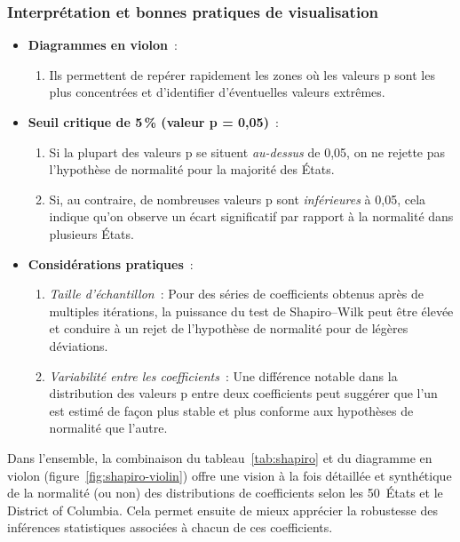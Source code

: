 \subsubsection*{Interprétation et bonnes pratiques de visualisation}
\begin{itemize}
	\item \textbf{Diagrammes en violon}~: 
	\begin{enumerate}une boîte à moustaches central (indiquant la médiane et les quartiles) avec une courbe de densité symétrique autour de l'axe vertical. 
		\item Ils permettent de repérer rapidement les zones où les valeurs p sont les plus concentrées et d'identifier d'éventuelles valeurs extrêmes.
	\end{enumerate}
	
	\item \textbf{Seuil critique de 5\,\% (valeur p = 0,05)}~:  
	\begin{enumerate}
		\item Si la plupart des valeurs p se situent \emph{au-dessus} de 0,05, on ne rejette pas l'hypothèse de normalité pour la majorité des États.
		\item Si, au contraire, de nombreuses valeurs p sont \emph{inférieures} à 0,05, cela indique qu’on observe un écart significatif par rapport à la normalité dans plusieurs États.
	\end{enumerate}
	
	\item \textbf{Considérations pratiques}~:
	\begin{enumerate}
		\item \emph{Taille d'échantillon}~: Pour des séries de coefficients obtenus après de multiples itérations, la puissance du test de Shapiro--Wilk peut être élevée et conduire à un rejet de l'hypothèse de normalité pour de légères déviations.
		\item \emph{Variabilité entre les coefficients}~: Une différence notable dans la distribution des valeurs p entre deux coefficients peut suggérer que l'un est estimé de façon plus stable et plus conforme aux hypothèses de normalité que l'autre.
	\end{enumerate}
\end{itemize}

Dans l'ensemble, la combinaison du tableau~\ref{tab:shapiro} et du diagramme en violon (figure~\ref{fig:shapiro-violin}) offre une vision à la fois détaillée et synthétique de la normalité (ou non) des distributions de coefficients selon les 50~États et le District of Columbia. Cela permet ensuite de mieux apprécier la robustesse des inférences statistiques associées à chacun de ces coefficients.


